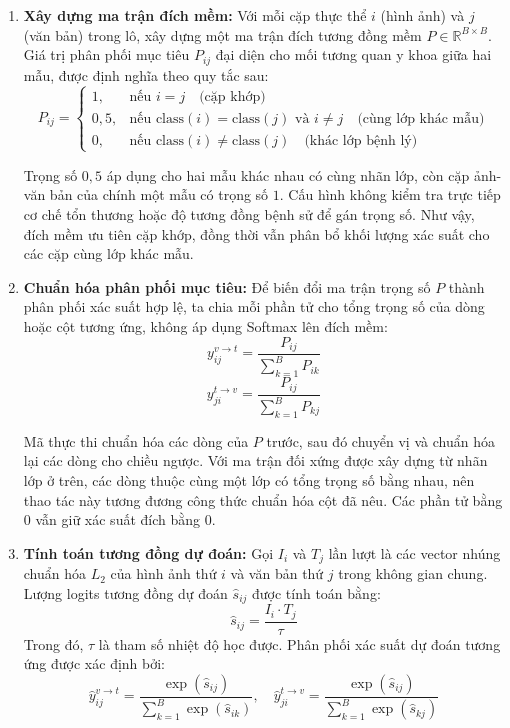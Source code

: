 \begin{enumerate}
    \item \textbf{Xây dựng ma trận đích mềm:}
    Với mỗi cặp thực thể $i$ (hình ảnh) và $j$ (văn bản) trong lô, xây dựng một ma trận đích tương đồng mềm $P \in \mathbb{R}^{B \times B}$. Giá trị phân phối mục tiêu $P_{ij}$ đại diện cho mối tương quan y khoa giữa hai mẫu, được định nghĩa theo quy tắc sau:
    \begin{equation}
    P_{ij} = \begin{cases} 
    1, & \text{nếu } i = j \quad \text{(cặp khớp)} \\
    0{,}5, & \text{nếu } \text{class}(i) = \text{class}(j) \text{ và } i \neq j \quad \text{(cùng lớp khác mẫu)} \\
    0, & \text{nếu } \text{class}(i) \neq \text{class}(j) \quad \text{(khác lớp bệnh lý)}
    \end{cases}
    \end{equation}
    
    Trọng số $0{,}5$ áp dụng cho hai mẫu khác nhau có cùng nhãn lớp, còn cặp ảnh-văn bản của chính một mẫu có trọng số $1$. Cấu hình không kiểm tra trực tiếp cơ chế tổn thương hoặc độ tương đồng bệnh sử để gán trọng số. Như vậy, đích mềm ưu tiên cặp khớp, đồng thời vẫn phân bổ khối lượng xác suất cho các cặp cùng lớp khác mẫu.


    \item \textbf{Chuẩn hóa phân phối mục tiêu:}
    Để biến đổi ma trận trọng số $P$ thành phân phối xác suất hợp lệ, ta chia mỗi phần tử cho tổng trọng số của dòng hoặc cột tương ứng, không áp dụng Softmax lên đích mềm:
    \begin{equation}
    y_{ij}^{v \to t} = \frac{P_{ij}}{\sum_{k=1}^{B} P_{ik}}
    \end{equation}
    \begin{equation}
    y_{ji}^{t \to v} = \frac{P_{ij}}{\sum_{k=1}^{B} P_{kj}}
    \end{equation}

    Mã thực thi chuẩn hóa các dòng của $P$ trước, sau đó chuyển vị và chuẩn hóa lại các dòng cho chiều ngược. Với ma trận đối xứng được xây dựng từ nhãn lớp ở trên, các dòng thuộc cùng một lớp có tổng trọng số bằng nhau, nên thao tác này tương đương công thức chuẩn hóa cột đã nêu. Các phần tử bằng 0 vẫn giữ xác suất đích bằng 0.

    \item \textbf{Tính toán tương đồng dự đoán:}
    Gọi $I_i$ và $T_j$ lần lượt là các vector nhúng chuẩn hóa $L_2$ của hình ảnh thứ $i$ và văn bản thứ $j$ trong không gian chung. Lượng logits tương đồng dự đoán $\hat{s}_{ij}$ được tính toán bằng:
    \begin{equation}
    \hat{s}_{ij} = \frac{I_i \cdot T_j}{\tau}
    \end{equation}
    Trong đó, $\tau$ là tham số nhiệt độ học được. Phân phối xác suất dự đoán tương ứng được xác định bởi:
    \begin{equation}
    \hat{y}_{ij}^{v \to t} = \frac{\exp(\hat{s}_{ij})}{\sum_{k=1}^{B} \exp(\hat{s}_{ik})}, \quad 
    \hat{y}_{ji}^{t \to v} = \frac{\exp(\hat{s}_{ij})}{\sum_{k=1}^{B} \exp(\hat{s}_{kj})}
    \end{equation}


\end{enumerate}

